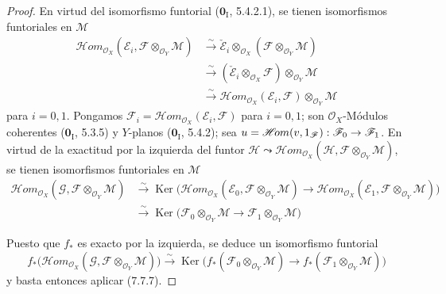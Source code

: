 \documentclass[10pt,oneside,openany]{book}
\theoremstyle{egaenv}\newtheorem*{env}{---}
\theoremstyle{egastatement}
\theoremstyle{egadescription}
\newcommand{\oldpage}[2][]{\marginnote{\normalfont\scriptsize\textbf{#1}\,|\,#2}\ignorespaces}
\renewcommand{\to}{\mathchoice{\longrightarrow}{\rightarrow}{\rightarrow}{\rightarrow}}
\begin{document}
\begin{proof}
En virtud del isomorfismo funtorial ($\mathbf{0}_{\mathrm I}$, 5.4.2.1), se tienen
isomorfismos funtoriales en $\mathscr M$
\begin{align*}
  \mathscr{H}\!om_{\mathscr O_X}
    (\mathscr E_i,\mathscr F\otimes_{\mathscr O_Y}\mathscr M)
  &\xrightarrow{\sim}
  \check{\mathscr E}_i
    \otimes_{\mathscr O_X}
    (\mathscr F\otimes_{\mathscr O_Y}\mathscr M)\\
  &\xrightarrow{\sim}
  (\check{\mathscr E}_i\otimes_{\mathscr O_X}\mathscr F)
    \otimes_{\mathscr O_Y}\mathscr M\\
  &\xrightarrow{\sim}
  \mathscr{H}\!om_{\mathscr O_X}(\mathscr E_i,\mathscr F)
    \otimes_{\mathscr O_Y}\mathscr M
\end{align*}
para $i=0,1$. Pongamos
$\mathscr F_i=\mathscr{H}\!om_{\mathscr O_X}(\mathscr E_i,\mathscr F)$ para
$i=0,1$; son $\mathscr O_X$-Módulos coherentes ($\mathbf{0}_{\mathrm I}$, 5.3.5)
y $Y$-planos ($\mathbf{0}_{\mathrm I}$, 5.4.2); sea
$u=\mathscr{H}\!om(v,1_{\mathscr F}):\mathscr F_0\to\mathscr F_1$. En virtud de
la exactitud por la izquierda del funtor
$\mathscr H\leadsto\mathscr{H}\!om_{\mathscr O_X}
(\mathscr H,\mathscr F\otimes_{\mathscr O_Y}\mathscr M)$, se tienen isomorfismos
funtoriales en $\mathscr M$
\begin{align*}
  \mathscr{H}\!om_{\mathscr O_X}
    (\mathscr G,\mathscr F\otimes_{\mathscr O_Y}\mathscr M)
  &\xrightarrow{\sim}
  \operatorname{Ker}
  \bigl(
    \mathscr{H}\!om_{\mathscr O_X}
      (\mathscr E_0,\mathscr F\otimes_{\mathscr O_Y}\mathscr M)
    \longrightarrow
    \mathscr{H}\!om_{\mathscr O_X}
      (\mathscr E_1,\mathscr F\otimes_{\mathscr O_Y}\mathscr M)
  \bigr)\\
  &\xrightarrow{\sim}
  \operatorname{Ker}
  \bigl(
    \mathscr F_0\otimes_{\mathscr O_Y}\mathscr M
    \longrightarrow
    \mathscr F_1\otimes_{\mathscr O_Y}\mathscr M
  \bigr)
\end{align*}

Puesto que $f_*$ es exacto por la izquierda, se deduce un isomorfismo funtorial
\[
  f_*
  \bigl(
    \mathscr{H}\!om_{\mathscr O_X}
      (\mathscr G,\mathscr F\otimes_{\mathscr O_Y}\mathscr M)
  \bigr)
  \xrightarrow{\sim}
  \operatorname{Ker}
  \bigl(
    f_*(\mathscr F_0\otimes_{\mathscr O_Y}\mathscr M)
    \longrightarrow
    f_*(\mathscr F_1\otimes_{\mathscr O_Y}\mathscr M)
  \bigr)
\]
y basta entonces aplicar (7.7.7).
\end{proof}

\oldpage[III]{203}
\end{document}
